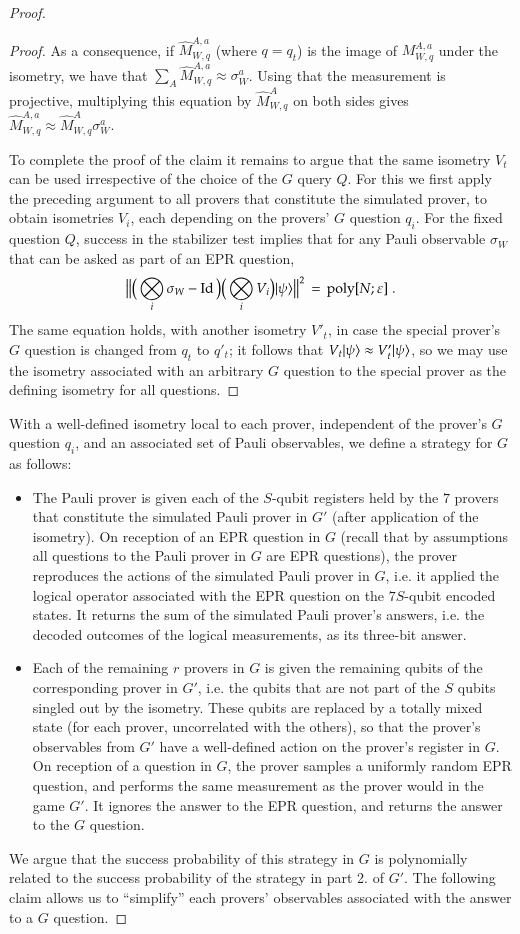 \begin{proof}
\begin{proof}
As a consequence, if $\hat{M}_{W,q}^{A,a}$ (where $q=q_t$) is the image of $M_{W,q}^{A,a}$ under the isometry, we have that $\sum_A \hat{M}_{W,q}^{A,a} \approx \sigma_W^a$. Using that the measurement is projective, multiplying this equation by $\hat{M}_{W,q}^{A}$ on both sides gives $\hat{M}_{W,q}^{A,a} \approx \hat{M}_{W,q}^{A}\sigma_W^a$. 

To complete the proof of the claim it remains to argue that the same isometry $V_t$ can be used irrespective of the choice of the $G$ query $Q$. For this we first apply the preceding argument to all provers that constitute the simulated prover, to obtain isometries $V_i$, each depending on the provers' $G$ question $q_i$. For the fixed question $Q$, success in the stabilizer test implies that for any Pauli observable $\sigma_W$ that can be asked as part of an EPR question, 
\[\big\| \big(\bigotimes_i \sigma_W - \mathop{\mathrm{Id}}\!\mathinner{} \big) \big(\bigotimes_i V_i\big) |\psi\rangle\big\|^2 \,=\,\operatorname{poly}[N;\varepsilon]\;.\] 
The same equation holds, with another isometry $V'_t$, in case the special prover's $G$ question is changed from $q_t$ to $q'_t$; it follows that $V_t |\psi\rangle \approx V'_t |\psi\rangle$, so we may use the isometry associated with an arbitrary $G$ question to the special prover as the defining isometry for all questions. \end{proof}

With a well-defined isometry local to each prover, independent of the prover's $G$ question $q_i$, and an associated set of Pauli observables, we define a strategy for $G$ as follows:
\begin{itemize}
\item The Pauli prover is given each of the $S$-qubit registers held by the $7$ provers that constitute the simulated Pauli prover in $G'$ (after application of the isometry). On reception of an EPR question in $G$ (recall that by assumptions all questions to the Pauli prover in $G$ are EPR questions), the prover reproduces the actions of the simulated Pauli prover in $G$, i.e. it applied the logical operator associated with the EPR question on the $7S$-qubit encoded states. It returns the sum of the simulated Pauli prover's answers, i.e. the decoded outcomes of the logical measurements, as its three-bit answer.
\item Each of the remaining $r$ provers in $G$ is given the remaining qubits of the corresponding prover in $G'$, i.e. the qubits that are not part of the $S$ qubits singled out by the isometry. These qubits are replaced by a totally mixed  state (for each prover, uncorrelated with the others), so that the prover's observables from $G'$ have a well-defined action on the prover's register in $G$. On reception of a question in $G$, the prover samples a uniformly random EPR question, and performs the same measurement as the prover would in the game $G'$. It ignores the answer to the EPR question, and returns the answer to the $G$ question. 
\end{itemize} 
We argue that the success probability of this strategy in $G$ is polynomially related to the success probability of the strategy in part 2. of $G'$. The following claim allows us to ``simplify'' each provers' observables associated with the answer to a $G$ question. 


\end{proof}

